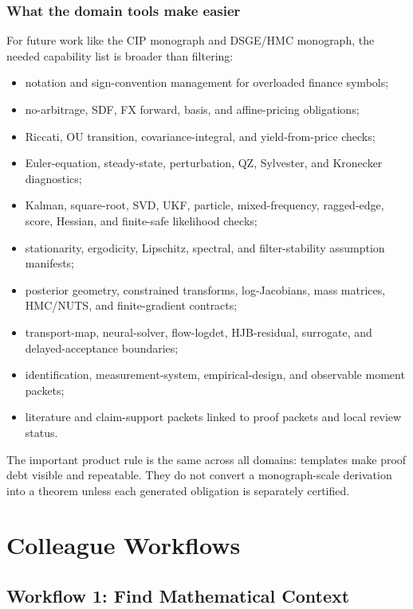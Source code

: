 \documentclass[12pt,a4paper,openany]{book}
\begin{document}
\section{What the domain tools make easier}

For future work like the CIP monograph and DSGE/HMC monograph, the needed
capability list is broader than filtering:

\begin{itemize}
  \item notation and sign-convention management for overloaded finance symbols;
  \item no-arbitrage, SDF, FX forward, basis, and affine-pricing obligations;
  \item Riccati, OU transition, covariance-integral, and yield-from-price
        checks;
  \item Euler-equation, steady-state, perturbation, QZ, Sylvester, and
        Kronecker diagnostics;
  \item Kalman, square-root, SVD, UKF, particle, mixed-frequency, ragged-edge,
        score, Hessian, and finite-safe likelihood checks;
  \item stationarity, ergodicity, Lipschitz, spectral, and filter-stability
        assumption manifests;
  \item posterior geometry, constrained transforms, log-Jacobians, mass
        matrices, HMC/NUTS, and finite-gradient contracts;
  \item transport-map, neural-solver, flow-logdet, HJB-residual, surrogate, and
        delayed-acceptance boundaries;
  \item identification, measurement-system, empirical-design, and observable
        moment packets;
  \item literature and claim-support packets linked to proof packets and local
        review status.
\end{itemize}

The important product rule is the same across all domains: templates make proof
debt visible and repeatable. They do not convert a monograph-scale derivation
into a theorem unless each generated obligation is separately certified.

\part{Colleague Workflows}

\chapter{Workflow 1: Find Mathematical Context}
\end{document}
